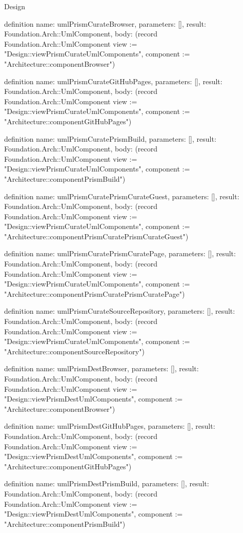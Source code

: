 \begin{lexlean}{Design}
\begin{semanticmodule}
definition{
  name: umlPrismCurateBrowser,
  parameters: [],
  result: Foundation.Arch::UmlComponent,
  body: (record Foundation.Arch::UmlComponent {view := "Design::viewPrismCurateUmlComponents", component := "Architecture::componentBrowser"})
}

definition{
  name: umlPrismCurateGitHubPages,
  parameters: [],
  result: Foundation.Arch::UmlComponent,
  body: (record Foundation.Arch::UmlComponent {view := "Design::viewPrismCurateUmlComponents", component := "Architecture::componentGitHubPages"})
}

definition{
  name: umlPrismCuratePrismBuild,
  parameters: [],
  result: Foundation.Arch::UmlComponent,
  body: (record Foundation.Arch::UmlComponent {view := "Design::viewPrismCurateUmlComponents", component := "Architecture::componentPrismBuild"})
}

definition{
  name: umlPrismCuratePrismCurateGuest,
  parameters: [],
  result: Foundation.Arch::UmlComponent,
  body: (record Foundation.Arch::UmlComponent {view := "Design::viewPrismCurateUmlComponents", component := "Architecture::componentPrismCuratePrismCurateGuest"})
}

definition{
  name: umlPrismCuratePrismCuratePage,
  parameters: [],
  result: Foundation.Arch::UmlComponent,
  body: (record Foundation.Arch::UmlComponent {view := "Design::viewPrismCurateUmlComponents", component := "Architecture::componentPrismCuratePrismCuratePage"})
}

definition{
  name: umlPrismCurateSourceRepository,
  parameters: [],
  result: Foundation.Arch::UmlComponent,
  body: (record Foundation.Arch::UmlComponent {view := "Design::viewPrismCurateUmlComponents", component := "Architecture::componentSourceRepository"})
}

definition{
  name: umlPrismDestBrowser,
  parameters: [],
  result: Foundation.Arch::UmlComponent,
  body: (record Foundation.Arch::UmlComponent {view := "Design::viewPrismDestUmlComponents", component := "Architecture::componentBrowser"})
}

definition{
  name: umlPrismDestGitHubPages,
  parameters: [],
  result: Foundation.Arch::UmlComponent,
  body: (record Foundation.Arch::UmlComponent {view := "Design::viewPrismDestUmlComponents", component := "Architecture::componentGitHubPages"})
}

definition{
  name: umlPrismDestPrismBuild,
  parameters: [],
  result: Foundation.Arch::UmlComponent,
  body: (record Foundation.Arch::UmlComponent {view := "Design::viewPrismDestUmlComponents", component := "Architecture::componentPrismBuild"})
}


\end{semanticmodule}
\end{lexlean}
